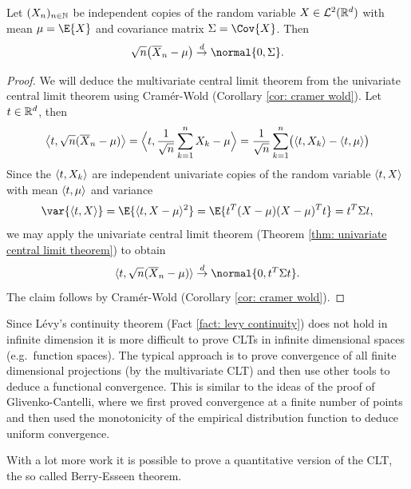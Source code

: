\begin{mdframed}[innertopmargin=0pt]
\begin{theorem}
    \label{thm: central limit theorem}
    Let \((X_n)_{n\in \nat}\) be independent copies of the random variable
    \(X\in \cL^2(\real^\dims)\) with mean \(\mu = \E{X}\) and covariance matrix
    \(\Sigma = \Cov{X}\). Then
    \[
        \sqrt{n}\bigl(\mean{X}_n - \mu\bigr)
        \overset{d}\to \normal{0, \Sigma}.
    \]
\end{theorem}
\end{mdframed}
\begin{proof}
    We will deduce the multivariate central limit theorem from the univariate
    central limit theorem using Cramér-Wold (Corollary \ref{cor: cramer wold}).
    Let \(t\in \real^\dims\), then
    \[
        \scp[\big]{t, \sqrt{n}(\mean{X}_n - \mu)}
        = \scp[\Big]{t, \frac1{\sqrt{n}} \sum_{k=1}^n X_k - \mu}
        = \frac1{\sqrt{n}}\sum_{k=1}^n \bigl(\scp{t, X_k} - \scp{t, \mu}\bigr)
    \]
    Since the \(\scp{t, X_k}\) are independent univariate copies of the random
    variable \(\scp{t, X}\) with mean \(\scp{t, \mu}\) and variance
    \[
        \var{\scp{t,X}}
        = \E{\scp{t, X - \mu}^2}
        = \E{t^\transpose (X - \mu)(X - \mu)^\transpose t}
        = t^\transpose \Sigma t,
    \]
    we may apply the univariate central limit theorem (Theorem \ref{thm: univariate central limit theorem})
    to obtain
    \[
        \scp{t, \sqrt{n}(\mean{X}_n - \mu)}
        \overset{d}\to \normal{0, t^\transpose \Sigma t}.
    \]
    The claim follows by Cramér-Wold (Corollary \ref{cor: cramer wold}).
\end{proof}

\begin{remark}
    Since Lévy's continuity theorem (Fact \ref{fact: levy continuity}) does
    not hold in infinite dimension it is more difficult to prove CLTs
    in infinite dimensional spaces (e.g.\ function spaces). The typical
    approach is to prove convergence of all finite dimensional projections
    (by the multivariate CLT) and then use other tools to deduce a functional
    convergence. This is similar to the ideas of the proof of Glivenko-Cantelli,
    where we first proved convergence at a finite number of points and then
    used the monotonicity of the empirical distribution function to deduce uniform
    convergence.
\end{remark}

With a lot more work it is possible to prove a quantitative version
of the CLT, the so called Berry-Esseen theorem. 

